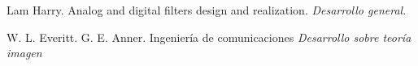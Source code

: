\documentclass[informe.tex]{subfiles}
\begin{document}
Lam Harry. Analog and digital filters design and realization.\newline 
\tab[1cm]\textit{Desarrollo general.}\newline

W. L. Everitt. G. E. Anner. Ingeniería de comunicaciones\newline
\tab[1cm]\textit{Desarrollo sobre teoría imagen}\newline
\end{document}

